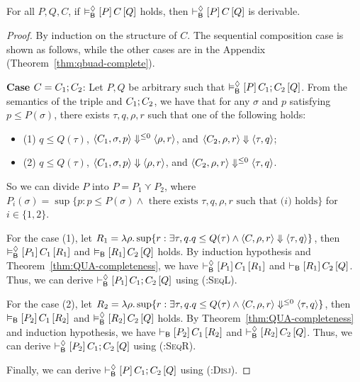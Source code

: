 \begin{theorem}
  For all $P,Q,C$, if $\vDash^{\Diamond}_{\mathsf{B}}\left[P\right]C\left[Q\right]$ holds, then $\vdash^{\Diamond}_{\mathsf{B}}\left[P\right]C\left[Q\right]$ is derivable.
\end{theorem}

\begin{proof}
  By induction on the structure of $C$. The sequential composition case is shown as follows, while the other cases are in the Appendix (Theorem~\ref{thm:qbuad-complete}).

  \textbf{Case} $C=C_1;C_2$: Let $P,Q$ be arbitrary such that $\vDash^{\Diamond}_{\mathsf{B}}\left[P\right]C_1;C_2\left[Q\right]$. From the semantics of the \QBUAd triple and $C_1;C_2$, we have that for any $\sigma$ and $p$ satisfying $p\le P(\sigma)$, there exists $\tau,q,\rho,r$ such that one of the following holds:
  \begin{itemize}
    \item (1) $q\le Q(\tau)$, $\left\langle C_1,\sigma,p\right\rangle\Downarrow^{\le 0}\left\langle\rho,r\right\rangle$, and $\left\langle C_2,\rho,r\right\rangle\Downarrow\left\langle\tau,q\right\rangle$;
    \item (2) $q\le Q(\tau)$, $\left\langle C_1,\sigma,p\right\rangle\Downarrow\left\langle\rho,r\right\rangle$, and $\left\langle C_2,\rho,r\right\rangle\Downarrow^{\le 0}\left\langle\tau,q\right\rangle$.
  \end{itemize}
  So we can divide $P$ into $P=P_1\curlyvee P_2$, where $P_i(\sigma)=\sup\{p:p\le P(\sigma)\land\text{ there exists }\tau,q,\rho,r\text{ such that (}i\text{) holds}\}$ for $i\in\{1,2\}$.
  
  For the case (1), let $R_1=\lambda\rho.\sup\{r:\exists\tau,q.q\le Q(\tau)\land\left\langle C,\rho,r\right\rangle\Downarrow\left\langle\tau,q\right\rangle\}$, then $\vDash^{\Diamond}_{\mathsf{B}}\left[P_1\right]C_1\left[R_1\right]$ and $\vDash_{\mathsf{B}}\left[R_1\right]C_2\left[Q\right]$ holds. By induction hypothesis and Theorem~\ref{thm:QUA-completeness}, we have $\vdash^{\Diamond}_{\mathsf{B}}\left[P_1\right]C_1\left[R_1\right]$ and $\vdash_{\mathsf{B}}\left[R_1\right]C_2\left[Q\right]$. Thus, we can derive $\vdash^{\Diamond}_{\mathsf{B}}\left[P_1\right]C_1;C_2\left[Q\right]$ using \textsc{(\Bd:SeqL)}.
  
  For the case (2), let $R_2=\lambda\rho.\sup\{r:\exists\tau,q.q\le Q(\tau)\land\left\langle C,\rho,r\right\rangle\Downarrow^{\le 0}\left\langle\tau,q\right\rangle\}$, then $\vDash_{\mathsf{B}}\left[P_2\right]C_1\left[R_2\right]$ and $\vDash^{\Diamond}_{\mathsf{B}}\left[R_2\right]C_2\left[Q\right]$ holds. By Theorem~\ref{thm:QUA-completeness} and induction hypothesis, we have $\vdash_{\mathsf{B}}\left[P_2\right]C_1\left[R_2\right]$ and $\vdash^{\Diamond}_{\mathsf{B}}\left[R_2\right]C_2\left[Q\right]$. Thus, we can derive $\vdash^{\Diamond}_{\mathsf{B}}\left[P_2\right]C_1;C_2\left[Q\right]$ using \textsc{(\Bd:SeqR)}.
  
  Finally, we can derive $\vdash^{\Diamond}_{\mathsf{B}}\left[P\right]C_1;C_2\left[Q\right]$ using \textsc{(\Bd:Disj)}.
\end{proof}
